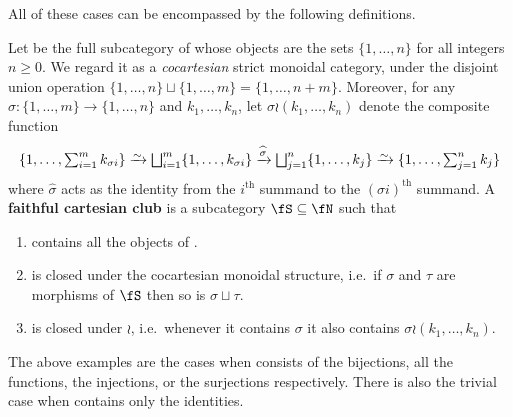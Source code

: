 All of these cases can be encompassed by the following definitions.

\begin{defn}
  Let \fN be the full subcategory of \bSet whose objects are the sets $\{1,\dots, n\}$ for all integers $n\ge 0$.
  We regard it as a \emph{cocartesian} strict monoidal category, under the disjoint union operation $\{1,\dots,n\} \sqcup \{1,\dots,m\} = \{1,\dots,n+m\}$.
  Moreover, for any $\sigma : \{1,\dots,m\} \to \{1,\dots,n\}$ and $k_1,\dots,k_n$, let $\sigma \wr (k_1,\dots,k_n)$ denote the composite function
  \begin{equation*}
    \{1,\dots,\textstyle\sum_{i=1}^m k_{\sigma i} \}
     \toiso \bigsqcup_{i=1}^m \{1,\dots,k_{\sigma i}\}
     \xto{\widehat{\sigma}} \bigsqcup_{j=1}^n \{1,\dots,k_{j}\}
     \toiso \{1,\dots,\textstyle\sum_{j=1}^n k_j \}
  \end{equation*}
  where $\widehat{\sigma}$ acts as the identity from the $i^{\mathrm{th}}$ summand to the $(\sigma i)^{\mathrm{th}}$ summand.
  A \textbf{faithful cartesian club} is a subcategory $\fS\subseteq \fN$ such that
  \begin{enumerate}
  \item \fS contains all the objects of \fN.
  \item \fS is closed under the cocartesian monoidal structure, i.e.\ if $\sigma$ and $\tau$ are morphisms of $\fS$ then so is $\sigma\sqcup \tau$.
  \item \fS is closed under $\wr$, i.e.\ whenever it contains $\sigma$ it also contains $\sigma \wr (k_1,\dots,k_n)$.
  \end{enumerate}
\end{defn}

The above examples are the cases when \fS consists of the bijections, all the functions, the injections, or the surjections respectively.
There is also the trivial case when \fS contains only the identities.

